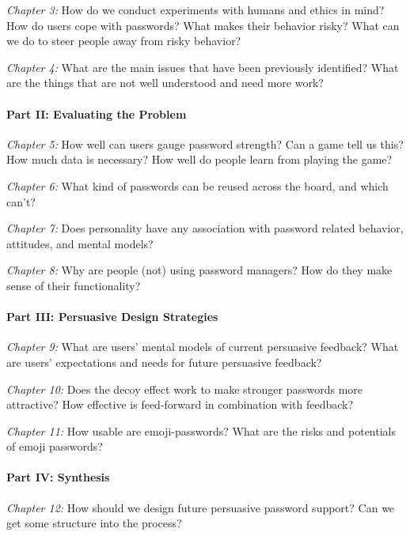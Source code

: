 \textit{Chapter 3:} %
How do we conduct experiments with humans and ethics in mind?
How do users cope with passwords? What makes their behavior risky?
What can we do to steer people away from risky behavior? 

\textit{Chapter 4:} 
What are the main issues that have been previously identified?
What are the things that are not well understood and need more work?


\paragraph{Part II: Evaluating the Problem}
\textit{Chapter 5:} %
How well can users gauge password strength?
Can a game tell us this?
How much data is necessary?
How well do people learn from playing the game?

\textit{Chapter 6:} %
What kind of passwords can be reused across the board, and which can't?

\textit{Chapter 7:} %
Does personality have any association with password related behavior, attitudes, and mental models?

\textit{Chapter 8:} %
Why are people (not) using password managers?
How do they make sense of their functionality?


\paragraph{Part III: Persuasive Design Strategies}
\textit{Chapter 9:} %
What are users' mental models of current persuasive feedback?
What are users' expectations and needs for future persuasive feedback?

\textit{Chapter 10:} %
Does the decoy effect work to make stronger passwords more attractive?
How effective is feed-forward in combination with feedback?

\textit{Chapter 11:} %
How usable are emoji-passwords?
What are the risks and potentials of emoji passwords?

\paragraph{Part IV: Synthesis}
\textit{Chapter 12:} %
How should we design future persuasive password support?
Can we get some structure into the process? 

